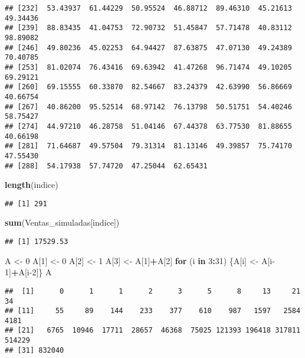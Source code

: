 \documentclass[
]{article}
\newenvironment{Shaded}{\begin{snugshade}}{\end{snugshade}}
\newcommand{\ControlFlowTok}[1]{\textcolor[rgb]{0.13,0.29,0.53}{\textbf{#1}}}
\newcommand{\DecValTok}[1]{\textcolor[rgb]{0.00,0.00,0.81}{#1}}
\newcommand{\FunctionTok}[1]{\textcolor[rgb]{0.13,0.29,0.53}{\textbf{#1}}}
\newcommand{\NormalTok}[1]{#1}
\newcommand{\OtherTok}[1]{\textcolor[rgb]{0.56,0.35,0.01}{#1}}
\newcommand{\SpecialCharTok}[1]{\textcolor[rgb]{0.81,0.36,0.00}{\textbf{#1}}}
\begin{document}
\begin{verbatim}
## [232]  53.43937  61.44229  50.95524  46.88712  89.46310  45.21613  49.34436
## [239]  88.83435  41.04753  72.90732  51.45847  57.71478  40.83112  98.89082
## [246]  49.80236  45.02253  64.94427  87.63875  47.07130  49.24389  70.40785
## [253]  81.02074  76.43416  69.63942  41.47268  96.71474  49.10205  69.29121
## [260]  69.15555  60.33870  82.54667  83.24379  42.63990  56.86669  40.66754
## [267]  40.86200  95.52514  68.97142  76.13798  50.51751  54.40246  58.75427
## [274]  44.97210  46.28758  51.04146  67.44378  63.77530  81.88655  40.66198
## [281]  71.64687  49.57504  79.31314  81.13146  49.39857  75.74170  47.55430
## [288]  54.17938  57.74720  47.25044  62.65431
\end{verbatim}

\begin{Shaded}
\begin{Highlighting}[]
\FunctionTok{length}\NormalTok{(indice)}
\end{Highlighting}
\end{Shaded}

\begin{verbatim}
## [1] 291
\end{verbatim}

\begin{Shaded}
\begin{Highlighting}[]
\FunctionTok{sum}\NormalTok{(Ventas\_simuladas[indice])}
\end{Highlighting}
\end{Shaded}

\begin{verbatim}
## [1] 17529.53
\end{verbatim}

\begin{Shaded}
\begin{Highlighting}[]
\NormalTok{A }\OtherTok{\textless{}{-}} \DecValTok{0} 
\NormalTok{ A[}\DecValTok{1}\NormalTok{] }\OtherTok{\textless{}{-}} \DecValTok{0} 
\NormalTok{ A[}\DecValTok{2}\NormalTok{] }\OtherTok{\textless{}{-}} \DecValTok{1}
\NormalTok{ A[}\DecValTok{3}\NormalTok{] }\OtherTok{\textless{}{-}}\NormalTok{ A[}\DecValTok{1}\NormalTok{]}\SpecialCharTok{+}\NormalTok{A[}\DecValTok{2}\NormalTok{]}
 \ControlFlowTok{for}\NormalTok{ (i }\ControlFlowTok{in} \DecValTok{3}\SpecialCharTok{:}\DecValTok{31}\NormalTok{) \{A[i] }\OtherTok{\textless{}{-}}\NormalTok{ A[i}\DecValTok{{-}1}\NormalTok{]}\SpecialCharTok{+}\NormalTok{A[i}\DecValTok{{-}2}\NormalTok{]\}}
\NormalTok{A}
\end{Highlighting}
\end{Shaded}

\begin{verbatim}
##  [1]      0      1      1      2      3      5      8     13     21     34
## [11]     55     89    144    233    377    610    987   1597   2584   4181
## [21]   6765  10946  17711  28657  46368  75025 121393 196418 317811 514229
## [31] 832040
\end{verbatim}
\end{document}
